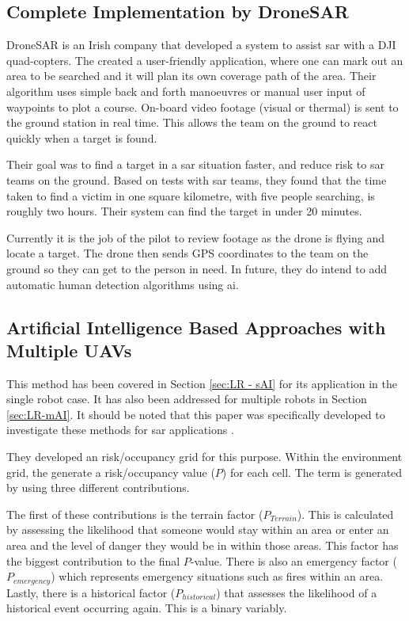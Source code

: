 \subsection{Complete Implementation by DroneSAR}
DroneSAR is an Irish company that developed a system to assist \acl{sar} with a DJI quad-copters. The created a user-friendly application, where one can mark out an area to be searched and it will plan its own coverage path of the area. Their algorithm uses simple back and forth manoeuvres or manual user input of waypoints to plot a course. On-board video footage (visual or thermal) is sent to the ground station in real time. This allows the team on the ground to react quickly when a target is found.  \cite{DroneSAR01}

Their goal was to find a target in a \acl{sar} situation faster, and reduce risk to \ac{sar} teams on the ground. Based on tests with \acl{sar} teams, they found that the time taken to find a victim in one square kilometre, with five people searching, is roughly two hours. Their system can find the target in under 20 minutes. \cite{DroneSAR01}
 
Currently it is the job of the pilot to review footage as the drone is flying and locate a target. The drone then sends GPS coordinates to the team on the ground so they can get to the person in need. In future, they do intend to add automatic human detection algorithms using \ac{ai}. \cite{DroneSARVideo}

\subsection{Artificial Intelligence Based Approaches with Multiple UAVs}
\label{sec:LR-SAR-AI}
This method has been covered in Section \ref{sec:LR - sAI} for its application in the single robot case. It has also been addressed for multiple robots in Section \ref{sec:LR-mAI}. It should be noted that this paper was specifically developed to investigate these methods for \acl{sar} applications \cite{Juan2018}.

They developed an risk/occupancy grid for this purpose. Within the environment grid, the generate a risk/occupancy value ($P$) for each cell. The term is generated by using three different contributions.

The first of these contributions is the terrain factor ($P_{Terrain}$). This is calculated by assessing the likelihood that someone would stay within an area or enter an area and the level of danger they would be in within those areas. This factor has the biggest contribution to the final $P$-value. There is also an emergency factor ($P_{emergency}$) which represents emergency situations such as fires within an area. Lastly, there is a historical factor ($P_{historical}$) that assesses the likelihood of a historical event occurring again. This is a binary variably.

